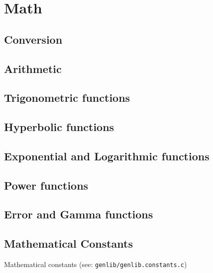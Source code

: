% 
%
\section{Math}
\label{section:fpm:math}

\subsection{Conversion}
\label{section:fpm:math:conversion}

\subsection{Arithmetic}
\label{section:fpm:math:arithmetic}

\subsection{Trigonometric functions}
\label{section:fpm:math:trig}

\subsection{Hyperbolic functions}
\label{section:fpm:math:hyperbolic}

\subsection{Exponential and Logarithmic functions}
\label{section:fpm:math:explog}

\subsection{Power functions}
\label{section:fpm:math:power}

\subsection{Error and Gamma functions}
\label{section:fpm:math:error-gamma}

\subsection{Mathematical Constants}
\label{section:fpm:math:constants}

Mathematical constants (see: {\tt genlib/genlib.constants.c})

